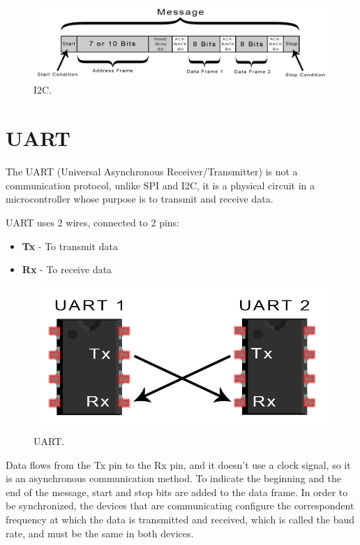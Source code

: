 \documentclass[portuguese]{ist-thesis}
\begin{document}
\begin{figure}[ht]
	\centering
	\includegraphics[width = 0.8\linewidth]{images/protocolos/i2c_message.png}
	\caption{I2C.}
	\label{fig:i2c}
\end{figure}

\section{UART}

The UART (Universal Asynchronous Receiver/Transmitter) is not a communication protocol, unlike SPI and I2C, it is a physical circuit in a microcontroller whose purpose is to transmit and receive data. 

UART uses 2 wires, connected to 2 pins:

\begin{itemize}
    \item \textbf{Tx} - To transmit data
    \item \textbf{Rx} - To receive data
\end{itemize}

\begin{figure}[ht]
	\centering
	\includegraphics[width = 0.8\linewidth]{images/protocolos/uart.png}
	\caption{UART.}
	\label{fig:uart}
\end{figure}

Data flows from the Tx pin to the Rx pin, and it doesn't use a clock signal, so it is an asynchronous communication method. To indicate the beginning and the end of the message, start and stop bits are added to the data frame. In order to be synchronized, the devices that are communicating configure the correspondent frequency at which the data is transmitted and received, which is called the baud rate, and must be the same in both devices. 
\end{document}
